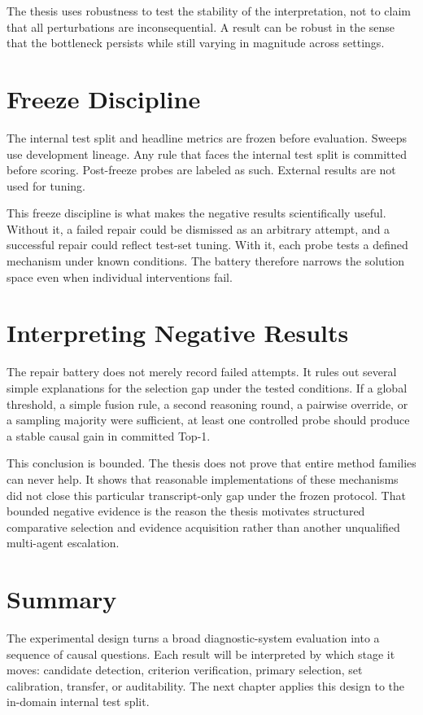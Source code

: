 The thesis uses robustness to test the stability of the interpretation, not to claim that all perturbations are inconsequential. A result can be robust in the sense that the bottleneck persists while still varying in magnitude across settings.

\section{Freeze Discipline}

The internal test split and headline metrics are frozen before evaluation. Sweeps use development lineage. Any rule that faces the internal test split is committed before scoring. Post-freeze probes are labeled as such. External results are not used for tuning.

This freeze discipline is what makes the negative results scientifically useful. Without it, a failed repair could be dismissed as an arbitrary attempt, and a successful repair could reflect test-set tuning. With it, each probe tests a defined mechanism under known conditions. The battery therefore narrows the solution space even when individual interventions fail.

\section{Interpreting Negative Results}

The repair battery does not merely record failed attempts. It rules out several simple explanations for the selection gap under the tested conditions. If a global threshold, a simple fusion rule, a second reasoning round, a pairwise override, or a sampling majority were sufficient, at least one controlled probe should produce a stable causal gain in committed Top-1.

This conclusion is bounded. The thesis does not prove that entire method families can never help. It shows that reasonable implementations of these mechanisms did not close this particular transcript-only gap under the frozen protocol. That bounded negative evidence is the reason the thesis motivates structured comparative selection and evidence acquisition rather than another unqualified multi-agent escalation.

\section{Summary}

The experimental design turns a broad diagnostic-system evaluation into a sequence of causal questions. Each result will be interpreted by which stage it moves: candidate detection, criterion verification, primary selection, set calibration, transfer, or auditability. The next chapter applies this design to the in-domain internal test split.
